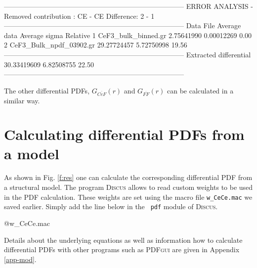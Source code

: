 \begin{MacVerbatim}
 ------------------------------------------------------------------------------
 ERROR ANALYSIS - Removed contribution :   CE -   CE        Difference:  2 -  1
 ------------------------------------------------------------------------------
 Data                       File      Average data      Average sigma  Relative
    1        CeF3_bulk_binned.gr        2.75641990         0.00012269     0.00%
    2    CeF3_Bulk_npdf_03902.gr       29.27724457         5.72750998    19.56%
 ------------------------------------------------------------------------------
          Extracted differential       30.33419609         6.82508755    22.50%
 ------------------------------------------------------------------------------
\end{MacVerbatim}

The other differential PDFs, $G_{\overline{CeF}}(r)$ and $G_{\overline{FF}}(r)$ 
can be calculated in a similar way.

\section{Calculating differential PDFs from a model\label{s:exa:model}}

As shown in Fig. \ref{f:res} one can calculate the corresponding differential PDF  
from a structural model. The program \textsc{Discus} allows to read custom 
weights to be used in the PDF calculation. These weights are set using the macro 
file {\tt w\_CeCe.mac} we saved earlier. Simply add the line below in the {\tt 
pdf} module of \textsc{Discus}.

\begin{MacVerbatim}  
  @w_CeCe.mac 
\end{MacVerbatim}

Details about the underlying equations as well as information how to calculate 
differential PDFs with other programs such as \textsc{PDFgui} are given in 
Appendix \ref{app-mod}.

